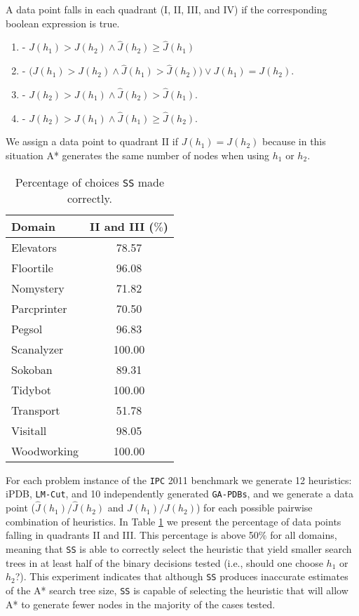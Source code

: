 
A data point falls in each quadrant (I, II, III, and IV) if the corresponding boolean expression is true. 

\begin{enumerate}[label=\Roman*] 
\item - $J(h_{1}) > J(h_{2}) \wedge \hat{J}(h_{2}) \ge \hat{J}(h_{1})$ 
\item - $\big(J(h_{1}) > J(h_{2}) \wedge \hat{J}(h_{1}) > \hat{J}(h_{2})\big) \vee J(h_{1}) = J(h_{2})$.
\item - $J(h_{2}) > J(h_{1}) \wedge \hat{J}(h_{2}) > \hat{J}(h_{1})$.
\item - $J(h_{2}) > J(h_{1}) \wedge \hat{J}(h_{1}) \ge \hat{J}(h_{2})$.
\end{enumerate}

We assign a data point to quadrant II if $J(h_{1}) = J(h_{2})$ because in this situation A* generates the same number of nodes when using $h_1$ or $h_2$.

\begin{table}[htb]
\centering
\begin{tabular}{lc}
\hline
Domain      & II and III ($\%$) \\ \hline
Elevators   & 78.57    \\
Floortile   & 96.08    \\
Nomystery   & 71.82    \\
Parcprinter & 70.50    \\
Pegsol      & 96.83    \\
Scanalyzer  & 100.00   \\
Sokoban     & 89.31    \\
Tidybot     & 100.00   \\
Transport   & 51.78    \\
Visitall    & 98.05    \\
Woodworking & 100.00   \\ \hline
\end{tabular}
\caption{Percentage of choices \texttt{SS} made correctly.}
\label{tb:per_ss_made_correctly}
\end{table}

For each problem instance of the \texttt{IPC} 2011 benchmark we generate 12 heuristics: iPDB, \texttt{LM-Cut}, and 10 independently generated \texttt{GA-PDBs}, and we generate a data point ($\hat{J}(h_{1})/\hat{J}(h_{2})$ and $J(h_{1})/J(h_{2})$) for each possible pairwise combination of heuristics. In Table \ref{tb:per_ss_made_correctly} we present the percentage of data points falling in quadrants II and III. This percentage is above 50$\%$ for all domains, meaning that \texttt{SS} is able to correctly select the heuristic that yield smaller search trees in at least half of the binary decisions tested (i.e., should one choose $h_1$ or $h_2$?). 
%
This experiment indicates that although \texttt{SS} produces inaccurate estimates of the A* search tree size, \texttt{SS} is capable of selecting the heuristic that will allow A* to generate fewer nodes in the majority of the cases tested. 

